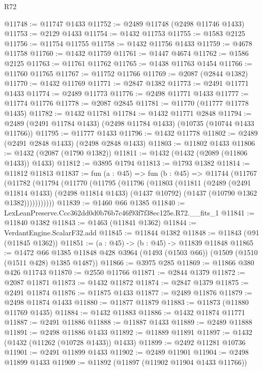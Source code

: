 \begin{lexlean}{R72}
\begin{coremodule}
@11748 := @11747 @1433
@11752 := @2489 @11748 (@2498 @11746 @1433)
@11753 := @2129 @1433
@11754 := @1432 @11753
@11755 := @1583 @2125
@11756 := @11754 @11755
@11758 := @1432 @11756 @1433
@11759 := @4678 @11758
@11760 := @1432 @11759
@11761 := @1447 @4674
@11762 := @1586 @2125
@11763 := @11761 @11762
@11765 := @1438 @11763 @1454
@11766 := @11760 @11765
@11767 := @11752 @11766
@11769 := @2087 (@2844 @1382)
@11770 := @1432 @11769
@11771 := @2847 @1382
@11773 := @2491 @11771 @1433
@11774 := @2489 @11773
@11776 := @2498 @11771 @1433
@11777 := @11774 @11776
@11778 := @2087 @2845
@11781 := @11770 (@11777 @11778 @1435)
@11782 := @1432 @11781
@11784 := @1432 @11771 @2848
@11794 := @2489 (@2491 @11784 @1433) (@2498 @11784 @1433) (@10735 (@10744 @1433 @11766))
@11795 := @11777 @1433
@11796 := @1432 @11778
@11802 := @2489 (@2491 @2848 @1433) (@2498 @2848 @1433)
@11803 := @11802 @1433
@11806 := @1432 (@2087 (@1790 @1382))
@11811 := @1432 (@1432 (@2089 (@11806 @1433)) @1433)
@11812 := @3895 @1794
@11813 := @1793 @1382
@11814 := @11812 @11813
@11837 := fun (a : @45) =>
  fun (b : @45) =>
  @11744
    (@11767
      (@11782
        (@11794
          (@11770
            (@11795
              (@11796
                (@11803
                  (@11811
                    (@2489
                      (@2491 @11814 @1433)
                      (@2498 @11814 @1433)
                      (@1437 @10792)
                      (@1437 (@10790 @1362 @1382)))))))))))
@11839 := @1460 @66 @1385
@11840 := LexLeanPreserve.Ccc362dd0d0b76b7c46f93f7f38ec125e.R72.__fits_1
@11841 := @11840 @1382
@11843 := @1463 (@11841 @1362)
@11844 := VerdantEngine.ScalarF32.add
@11845 := @11844 @1382
@11848 := @11843 (@91 (@11845 @1362))
@11851 := (a : @45) -> (b : @45) -> @11839 @11848
@11865 := @1472
    @66
    @1385
    @11848
    @428
    @3964
    (@1493 (@1503 @66))
    (@1509 (@1510 (@1511 @428) @1385 @1487))
@11866 := @3975 @285
@11869 := @11866 @380 @426 @11743
@11870 := @2550 @11766
@11871 := @2844 @1379
@11872 := @2087 @11871
@11873 := @1432 @11872
@11874 := @2847 @1379
@11875 := @2491 @11874
@11876 := @11875 @1433
@11877 := @2489 @11876
@11879 := @2498 @11874 @1433
@11880 := @11877 @11879
@11883 := @11873 (@11880 @11769 @1435)
@11884 := @1432 @11883
@11886 := @1432 @11874 @11771
@11887 := @2491 @11886
@11888 := @11887 @1433
@11889 := @2489 @11888
@11891 := @2498 @11886 @1433
@11892 := @11889 @11891
@11897 := @1432 (@1432 (@11262 (@10728 @1433)) @1433)
@11899 := @2492 @11281 @10736
@11901 := @2491 @11899 @1433
@11902 := @2489 @11901
@11904 := @2498 @11899 @1433
@11909 := @11892 (@11897 (@11902 @11904 @1433 @11766))

\end{coremodule}
\end{lexlean}
